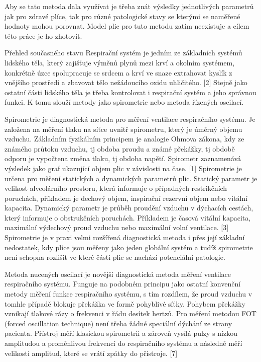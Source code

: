 Aby se tato metoda dala využívat je třeba znát výsledky jednotlivých parametrů jak pro zdravé plíce, tak pro různé patologické stavy se kterými se naměřené hodnoty mohou porovnat. Model plic pro tuto metodu zatím neexistuje a cílem této práce je ho zhotovit. 


\chap Přehled současného stavu
Respirační systém je jedním ze základních systémů lidského těla, který zajišťuje výměnů plynů mezi krví a okolním systémem, konkrétně úzce spolupracuje se srdcem a krví ve snaze extrahovat kyslík z vnějšího prostředí a zbavovat tělo nežádoucího oxidu uhličitého. [2] Stejně jako ostatní části lidského těla je třeba kontrolovat i respirační systém a jeho správnou funkci. K tomu slouží metody jako spirometrie nebo metoda řízených oscilací. 

Spirometrie je diagnostická metoda pro měření ventilace respiračního systému. Je založena na měření tlaku na síťce uvnitř spirometru, který je úměrný objemu vzduchu. Základním fyzikálním principem je analogie Ohmova zákona, kdy ze známého průtoku vzduchu, tj obdoba proudu a známé překážky, tj obdobě odporu je vypočtena změna tlaku, tj obdoba napětí. Spirometr zaznamenává výsledek jako graf ukazující objem plic v závislosti na čase. [1] Spirometrie je určena pro měření statických a dynamických parametrů plic. Statický parametr  je velikost alveolárního prostoru, která informuje o případných restrikčních poruchách, příkladem je dechový objem, inspirační rezervní objem nebo vitální kapacita. Dynamický parametr je průběh proudění vzduchu v dýchacích cestách, který informuje o obstrukčních poruchách. Příkladem je časová vitální kapacita, maximální výdechový proud vzduchu nebo maximální volní ventilace. [3]
Spirometrie je v praxi velmi rozšířená diagnostická metoda i přes její základní nedostatek, kdy plíce jsou měřeny jako jeden globální systém a tudíž spirometrie není schopna rozlišit ve které části plic se nachází potenciální patologie.

Metoda nucených oscilací je novější diagnostická metoda měření ventilace respiračního systému. Funguje na podobném principu jako ostatní konvenční metody měření funkce respiračního systému, s tím rozdílem, že proud vzduchu v tomhle případě blokuje překážka ve formě pohyblivé síťky. Pohybem překážky vznikají tlakové rázy o frekvenci v řádu desítek hertzů. Pro měření metodou FOT (forced oscillation technique) není třeba žádné speciální dýchání ze strany pacienta. Přístroj měří klasickou spirometrii a zároveň vysílá pulzy s nízkou amplitudou a proměnlivou frekvencí do respiračního systému a následně měří velikosti amplitud, které se vrátí zpátky do přístroje. [7]


